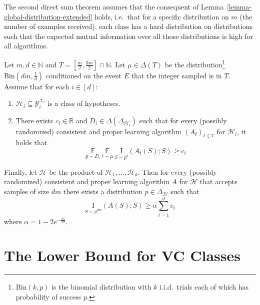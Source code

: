 \documentclass[final,12pt]{colt2018}
\newcommand{\EE}[1]{\underset{#1}{\mathbb{E}}}
\newcommand{\mc}[1]{\mathcal{#1}}
\newcommand{\mb}{\mathbb}
\newcommand{\mr}{\mathrm}
\newcommand{\cH}{\mc{H}}
\newcommand{\cX}{\mc{X}}
\newcommand{\cY}{\mc{Y}}
\newcommand{\I}[2]{\underset{#1}{\mathrm{I}}\left(#2\right)}
\begin{document}
 
 
 

{The second direct sum theorem assumes that the consequent of Lemma~\ref{lemma-global-distribution-extended} holds, i.e.\ that for a specific distribution on $m$ (the number of examples received), each class has a hard distribution on distributions such that the expected mutual information over all those distributions is high for all algorithms. }



\begin{theorem}\label{lemma_additivity}
	Let $m,d \in \mb{N}$ and $T= [\frac{m}{2},\frac{3m}{2}] \cap \mathbb{N}$. {Let $\mu\in\Delta(T)$ be the distribution\footnote{{$\mr{Bin}(k,p)$ is the binomial distribution with $k$ i.i.d.\ trials each of which has probability of success $p$.}} $\mr{Bin}(dm,\frac{1}{d})$ conditioned on the event
	$E$ that the integer sampled is in $T$.} Assume that for each $i\in[d]$:
	\begin{enumerate}
		\item{$\cH_i \subseteq \cY_i^{\cX_i}$ is a class of hypotheses.}
		\item{\label{assumption-cost-for-class}
			There exists $c_i\in\mb{R}$ and $D_i\in\Delta(\Delta_{\cH_i})$ such that for every (possibly randomized) consistent and proper learning algorithm $\left(A_t\right)_{t\in T}$ for $\cH_i$, it holds that
			\[
			\EE{p \sim D_i} \: \EE{t \sim \mu} \: \I{S \sim p^t}{A_t(S);S} \geq c_i
			\]}
	\end{enumerate}
	Finally, let $\cH$ be the product of $\cH_1,\dots,\cH_d$. Then for every (possibly randomized) consistent and proper learning algorithm $A$ for $\cH$ that accepts samples of size $dm$ there exists a distribution $p\in\Delta_\cH$ such that
	\[
	\I{S \sim p^{dm}}{A(S);S} \geq \alpha \sum_{i=1}^d c_i
	\]
	where $\alpha = 1-2e^{-\frac{m}{2d}}$.
\end{theorem}

\section{The Lower Bound for VC Classes}\label{VC bound}
\end{document}
